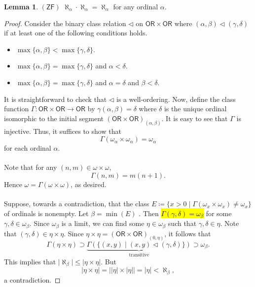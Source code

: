 \documentclass[10pt,letterpaper,cm]{nupset}
\theoremstyle{definition}
\theoremstyle{theorem}
\newtheorem{lemma}[definition]{Lemma}
\theoremstyle{remark}
\newcommand{\1}{\mathbf{1}}
\newcommand{\0}{\vec 0}
\newcommand{\zf}{\mathsf{ZF}}
\newcommand{\ord}{\mathsf{OR}}
\begin{document}
\begin{lemma}{$(\zf)$}
$\aleph_{\alpha} \cdot \aleph_{\alpha} = \aleph_{\alpha}$ for any ordinal $\alpha$.
\end{lemma}
\begin{proof} 
Consider the binary class relation $\lhd$ on $\ord \times \ord$ where $(\alpha, \beta)\lhd (\gamma, \delta)$ if at least one of the following conditions holds.
\begin{itemize}
\item  $\max\{\alpha, \beta\} <\max\{\gamma, \delta\}$.
\item $\max\{\alpha, \beta\} = \max\{\gamma, \delta\}$ and $\alpha < \delta$.
\item $\max\{\alpha, \beta\} = \max\{\gamma, \delta\}$ and $\alpha =\delta$ and $\beta < \delta$. 
\end{itemize}$ $It is straightforward to check that $\lhd$ is a well-ordering. Now, define the class function $\Gamma : \ord \times \ord \to \ord$ by $\gamma(\alpha, \beta) = \delta$ where $\delta$ is the unique ordinal isomorphic to the initial segment $(\ord \times \ord)_{(\alpha, \beta)}$. It is easy to see that $\Gamma$ is injective. Thus, it suffices to show that $$\Gamma(\omega_{\alpha} \times \omega_{\alpha}) = \omega_{\alpha}$$ for each ordinal $\alpha$. 
\\ \\
Note that for any $(n,m) \in \omega \times \omega$, $$ \Gamma(n,m) = 
m(n+1).$$ Hence $\omega =\Gamma(\omega \times \omega)$, as desired.  
\\ \\ Suppose, towards a contradiction, that the class $E\coloneqq \{x >0 \mid \Gamma(\omega_{x} \times \omega_{x}) \ne \omega_{x}\}$ of ordinals is nonempty. Let $\beta = \min( E )$ . Then \hl{$\Gamma(\gamma, \delta) = \omega_{\beta}$} for some $\gamma, \delta \in \omega_{\beta}$. Since $\omega_{\beta}$ is a limit, we can find some $\eta \in \omega_{\beta}$ such that $\gamma,\delta \in \eta$. Note that $(\gamma, \delta) \in \eta \times \eta$. Since $\eta \times \eta = (\ord \times \ord)_{(0, \eta)}$, it follows that $$\Gamma(\eta \times \eta) \supset \underbrace{\Gamma(\{(x,y) \mid (x,y) \lhd (\gamma, \delta)\})}_{\text{transitive}} \supset \omega_{\beta}. $$ This implies that $\lvert{\aleph_{\beta}}\rvert \leq \lvert{\eta \times \eta}\rvert$. But $$\lvert{\eta \times \eta}\rvert=  \lvert{\lvert{\eta}\rvert \times \lvert{\eta}\rvert}\rvert = \lvert{\eta}\rvert < \aleph_{\beta}   ,$$ a contradiction. 
\end{proof}
\end{document}
